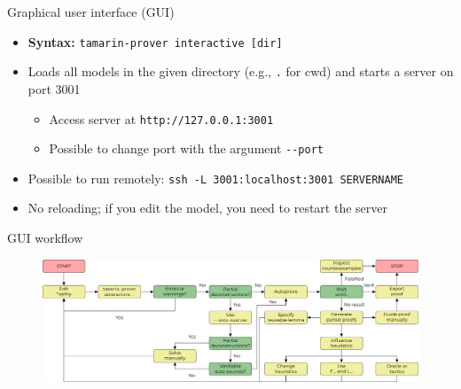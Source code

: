\documentclass[11pt,aspectratio=169]{beamer}
\begin{document}
\begin{frame}[fragile]{Graphical user interface (GUI)}
    \begin{itemize}
        \item \textbf{Syntax:}\hspace*{.2cm}
              \verb|tamarin-prover interactive [dir]|
        \item Loads all models in the given directory (e.g., \verb|.| for cwd) 
              and starts a server on port 3001
        \begin{itemize}
            \item Access server at \verb|http://127.0.0.1:3001|
            \item Possible to change port with the argument \verb|--port|
        \end{itemize}
        \item Possible to run remotely:
              \verb|ssh -L 3001:localhost:3001 SERVERNAME|
        \item No reloading; if you edit the model, you need to restart the 
              server
    \end{itemize}
\end{frame}

\begin{frame}[fragile]{GUI workflow}
    \begin{figure}
        \includegraphics[width=\textwidth]{./figures/lecture_6/workflow_gui}
    \end{figure}
\end{frame}
\end{document}
